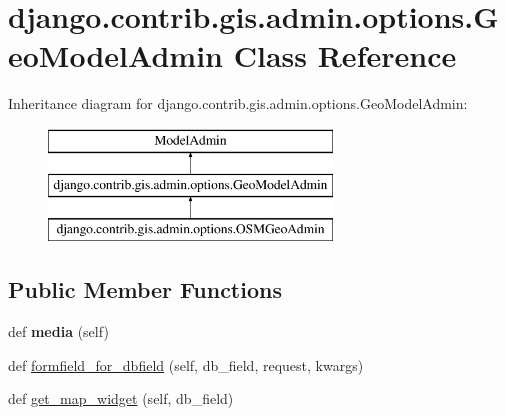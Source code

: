 \hypertarget{classdjango_1_1contrib_1_1gis_1_1admin_1_1options_1_1_geo_model_admin}{}\section{django.\+contrib.\+gis.\+admin.\+options.\+Geo\+Model\+Admin Class Reference}
\label{classdjango_1_1contrib_1_1gis_1_1admin_1_1options_1_1_geo_model_admin}
Inheritance diagram for django.\+contrib.\+gis.\+admin.\+options.\+Geo\+Model\+Admin\+:\begin{figure}[H]
\begin{center}
\leavevmode
\includegraphics[height=3.000000cm]{classdjango_1_1contrib_1_1gis_1_1admin_1_1options_1_1_geo_model_admin}
\end{center}
\end{figure}
\subsection*{Public Member Functions}
\begin{DoxyCompactItemize}
\item 
\mbox{\label{classdjango_1_1contrib_1_1gis_1_1admin_1_1options_1_1_geo_model_admin_a2bb43cb65b0e7acebdfee2fe0eb73612}} 
def {\bfseries media} (self)
\item 
def \mbox{\hyperlink{classdjango_1_1contrib_1_1gis_1_1admin_1_1options_1_1_geo_model_admin_aebf288ff57d5235d3031b7db6300fa57}{formfield\+\_\+for\+\_\+dbfield}} (self, db\+\_\+field, request, kwargs)
\item 
def \mbox{\hyperlink{classdjango_1_1contrib_1_1gis_1_1admin_1_1options_1_1_geo_model_admin_ae1f436e3ad0b6505b0a10c91f5484f32}{get\+\_\+map\+\_\+widget}} (self, db\+\_\+field)
\end{DoxyCompactItemize}

